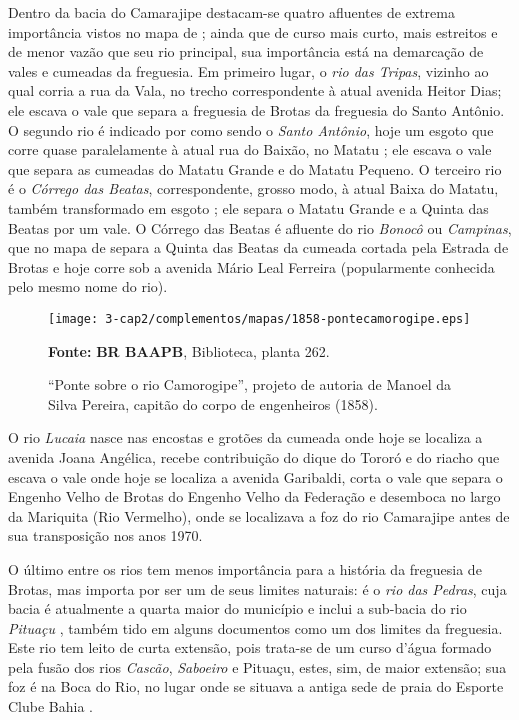 Dentro da bacia do Camarajipe destacam-se quatro afluentes de extrema importância vistos no mapa de ; ainda que de curso mais curto, mais estreitos e de menor vazão que seu rio principal, sua importância está na demarcação de vales e cumeadas da freguesia. Em primeiro lugar, o \textit{rio das Tripas}, vizinho ao qual corria a rua da Vala, no trecho correspondente à atual avenida Heitor Dias; ele escava o vale que separa a freguesia de Brotas da freguesia do Santo Antônio. O segundo rio é indicado por  como sendo o \textit{Santo Antônio}, hoje um esgoto que corre quase paralelamente à atual rua do Baixão, no Matatu \cite[p.~136]{santos_aguas_2010}; ele escava o vale que separa as cumeadas do Matatu Grande e do Matatu Pequeno. O terceiro rio é o \textit{Córrego das Beatas}, correspondente, grosso modo, à atual Baixa do Matatu, também transformado em esgoto \cite[p.~158]{santos_aguas_2010}; ele separa o Matatu Grande e a Quinta das Beatas por um vale. O Córrego das Beatas é afluente do rio \textit{Bonocô} ou \textit{Campinas}, que no mapa de  separa a Quinta das Beatas da cumeada cortada pela Estrada de Brotas e hoje corre sob a avenida Mário Leal Ferreira (popularmente conhecida pelo mesmo nome do rio).

\begin{landscape}
\begin{figure}[!htp]
\centering
\texttt{[image: 3-cap2/complementos/mapas/1858-pontecamorogipe.eps]}{\par \textbf{Fonte:} \textbf{BR BAAPB}, Biblioteca, planta 262. \par}
\caption{``Ponte sobre o rio Camorogipe'', projeto de autoria de Manoel da Silva Pereira, capitão do corpo de engenheiros (1858).}
\end{figure}
\end{landscape}

O rio \textit{Lucaia} nasce nas encostas e grotões da cumeada onde hoje se localiza a avenida Joana Angélica, recebe contribuição do dique do Tororó e do riacho que escava o vale onde hoje se localiza a avenida Garibaldi, corta o vale que separa o Engenho Velho de Brotas do Engenho Velho da Federação e desemboca no largo da Mariquita (Rio Vermelho), onde se localizava a foz do rio Camarajipe antes de sua transposição nos anos 1970.

O último entre os rios tem menos importância para a história da freguesia de Brotas, mas importa por ser um de seus limites naturais: é o \textit{rio das Pedras}, cuja bacia é atualmente a quarta maior do município e inclui a sub-bacia do rio \textit{Pituaçu} \cite[p.~175]{santos_aguas_2010}, também tido em alguns documentos como um dos limites da freguesia. Este rio tem leito de curta extensão, pois trata-se de um curso d'água formado pela fusão dos rios \textit{Cascão}, \textit{Saboeiro} e Pituaçu, estes, sim, de maior extensão; sua foz é na Boca do Rio, no lugar onde se situava a antiga sede de praia do Esporte Clube Bahia \cite[p.~175]{santos_aguas_2010}.

